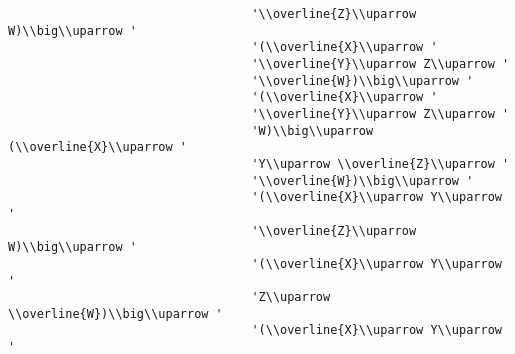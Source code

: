 \begin{verbatim}
                                  '\\overline{Z}\\uparrow W)\\big\\uparrow '
                                  '(\\overline{X}\\uparrow '
                                  '\\overline{Y}\\uparrow Z\\uparrow '
                                  '\\overline{W})\\big\\uparrow '
                                  '(\\overline{X}\\uparrow '
                                  '\\overline{Y}\\uparrow Z\\uparrow '
                                  'W)\\big\\uparrow (\\overline{X}\\uparrow '
                                  'Y\\uparrow \\overline{Z}\\uparrow '
                                  '\\overline{W})\\big\\uparrow '
                                  '(\\overline{X}\\uparrow Y\\uparrow '
                                  '\\overline{Z}\\uparrow W)\\big\\uparrow '
                                  '(\\overline{X}\\uparrow Y\\uparrow '
                                  'Z\\uparrow \\overline{W})\\big\\uparrow '
                                  '(\\overline{X}\\uparrow Y\\uparrow '

\end{verbatim}
